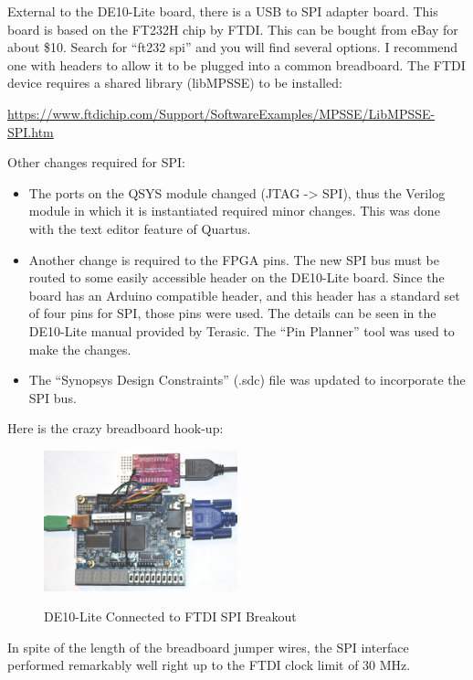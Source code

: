 External to the DE10-Lite board, there is a USB to SPI adapter board.  This board is based on the FT232H chip by FTDI.  This can be bought from eBay for about \$10.  Search for ``ft232 spi'' and you will find several options.  I recommend one with headers to allow it to be plugged into a common breadboard.  The FTDI device requires a shared library (libMPSSE) to be installed:

\url{https://www.ftdichip.com/Support/SoftwareExamples/MPSSE/LibMPSSE-SPI.htm}

Other changes required for SPI:

\begin{itemize}
	\item The ports on the QSYS module changed (JTAG -> SPI), thus the Verilog module in which it is instantiated required minor changes.  This was done with the text editor feature of Quartus.
    \item Another change is required to the FPGA pins.  The new SPI bus must be routed to some easily accessible header on the DE10-Lite board.  Since the board has an Arduino compatible header, and this header has a standard set of four pins for SPI, those pins were used.  The details can be seen in the DE10-Lite manual provided by Terasic.  The ``Pin Planner'' tool was used to make the changes.
    \item The ``Synopsys Design Constraints'' (.sdc) file was updated to incorporate the SPI bus.
\end{itemize}

Here is the crazy breadboard hook-up:

\begin{figure}[h]
	\centering
	\includegraphics[width=0.5\textwidth]{images/de10_spi}
	\centering\bfseries
	\caption{DE10-Lite Connected to FTDI SPI Breakout}
\end{figure}

In spite of the length of the breadboard jumper wires, the SPI interface performed remarkably well right up to the FTDI clock limit of 30 MHz.









